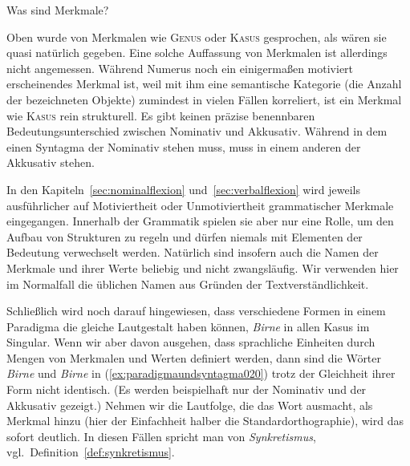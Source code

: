 \begin{Vertiefung}{Was sind Merkmale?}
  \label{vert:merkmale}

\noindent Oben wurde von Merkmalen wie \textsc{Genus} oder \textsc{Kasus} gesprochen, als wären sie quasi natürlich gegeben.
Eine solche Auffassung von Merkmalen ist allerdings nicht angemessen.
Während Numerus noch ein einigermaßen motiviert erscheinendes Merkmal ist, weil mit ihm eine semantische Kategorie (die Anzahl der bezeichneten Objekte) zumindest in vielen Fällen korreliert, ist ein Merkmal wie \textsc{Kasus} rein strukturell.
Es gibt keinen präzise benennbaren Bedeutungsunterschied zwischen Nominativ und Akkusativ.
Während in dem einen Syntagma der Nominativ stehen muss, muss in einem anderen der Akkusativ stehen.

In den Kapiteln~\ref{sec:nominalflexion} und~\ref{sec:verbalflexion} wird jeweils ausführlicher auf Motiviertheit oder Unmotiviertheit grammatischer Merkmale eingegangen.
Innerhalb der Grammatik spielen sie aber nur eine Rolle, um den Aufbau von Strukturen zu regeln und dürfen niemals mit Elementen der Bedeutung verwechselt werden.
Natürlich sind insofern auch die Namen der Merkmale und ihrer Werte beliebig und nicht zwangsläufig.
Wir verwenden hier im Normalfall die üblichen Namen aus Gründen der Textverständlichkeit.


\end{Vertiefung}

Schließlich wird noch darauf hingewiesen, dass verschiedene Formen in einem Paradigma die gleiche Lautgestalt haben können, \zB \textit{Birne} in allen Kasus im Singular.
Wenn wir aber davon ausgehen, dass sprachliche Einheiten durch Mengen von Merkmalen und Werten definiert werden, dann sind die Wörter \textit{Birne} und \textit{Birne} in (\ref{ex:paradigmaundsyntagma020}) trotz der Gleichheit ihrer Form nicht identisch.
(Es werden beispielhaft nur der Nominativ und der Akkusativ gezeigt.)
Nehmen wir die Lautfolge, die das Wort ausmacht, als Merkmal hinzu (hier der Einfachheit halber die Standardorthographie), wird das sofort deutlich.
In diesen Fällen spricht man von \textit{Synkretismus}, vgl.\ Definition~\ref{def:synkretismus}.

\begin{exe}
  \ex\label{ex:paradigmaundsyntagma020}
  \begin{xlist}
  \end{xlist}
\end{exe}

